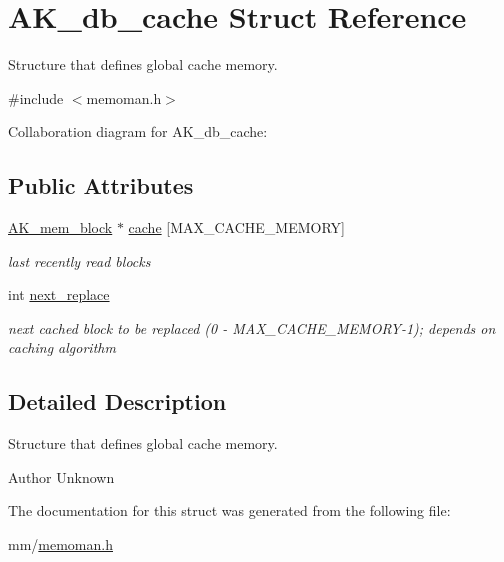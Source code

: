 \hypertarget{structAK__db__cache}{\section{A\+K\+\_\+db\+\_\+cache Struct Reference}
\label{structAK__db__cache}
}


Structure that defines global cache memory.  




{\ttfamily \#include $<$memoman.\+h$>$}



Collaboration diagram for A\+K\+\_\+db\+\_\+cache\+:
\subsection*{Public Attributes}
\begin{DoxyCompactItemize}
\item 
\hypertarget{structAK__db__cache_a77c58d95c53cc436131020502bdf9e9a}{\hyperlink{structAK__mem__block}{A\+K\+\_\+mem\+\_\+block} $\ast$ \hyperlink{structAK__db__cache_a77c58d95c53cc436131020502bdf9e9a}{cache} \mbox{[}M\+A\+X\+\_\+\+C\+A\+C\+H\+E\+\_\+\+M\+E\+M\+O\+R\+Y\mbox{]}}\label{structAK__db__cache_a77c58d95c53cc436131020502bdf9e9a}

\begin{DoxyCompactList}\small\item\em last recently read blocks \end{DoxyCompactList}\item 
\hypertarget{structAK__db__cache_a8bade287ccc6bb581d0ad793d6438eb0}{int \hyperlink{structAK__db__cache_a8bade287ccc6bb581d0ad793d6438eb0}{next\+\_\+replace}}\label{structAK__db__cache_a8bade287ccc6bb581d0ad793d6438eb0}

\begin{DoxyCompactList}\small\item\em next cached block to be replaced (0 -\/ M\+A\+X\+\_\+\+C\+A\+C\+H\+E\+\_\+\+M\+E\+M\+O\+R\+Y-\/1); depends on caching algorithm \end{DoxyCompactList}\end{DoxyCompactItemize}


\subsection{Detailed Description}
Structure that defines global cache memory. 

\begin{DoxyAuthor}{Author}
Unknown 
\end{DoxyAuthor}


The documentation for this struct was generated from the following file\+:\begin{DoxyCompactItemize}
\item 
mm/\hyperlink{memoman_8h}{memoman.\+h}\end{DoxyCompactItemize}
